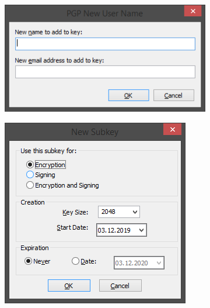\documentclass[
	a4paper,
	oneside,
	BCOR = 10mm,
	DIV = 12,
	12pt,
	headings = normal,
]{scrartcl}
\newlength{\gridunitwidth}
\begin{document}
		\begin{figure}[!htbp]
			\centering
			\begin{subfigure}[b]{5 \gridunitwidth - 1em / (2-1)}
				\includegraphics[width = \columnwidth]{./assets/p20.png}
				\caption{}
				\label{subfig:add-subname}
			\end{subfigure}%
			\hspace{1em}%
			\begin{subfigure}[b]{4 \gridunitwidth - 1em / (2-1)}
				\includegraphics[width = \columnwidth]{./assets/p21.png}
				\caption{}
				\label{subfig:add-subkey}
			\end{subfigure}
			\begin{subfigure}[b]{9 \gridunitwidth - 1em / (2-1)}

\end{subfigure}
\end{figure}
\end{document}
